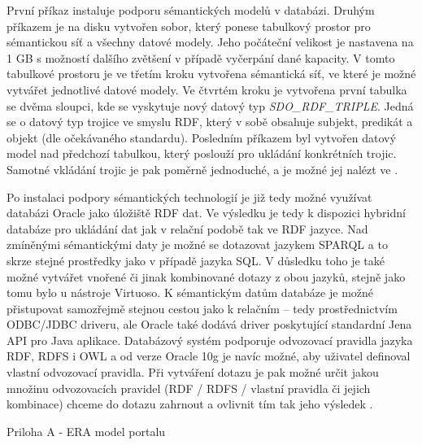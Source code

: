 \documentclass{projekt}
\begin{document}
První příkaz instaluje podporu sémantických modelů v databázi. Druhým příkazem je na disku vytvořen sobor, který ponese tabulkový prostor pro sémantickou síť a všechny datové modely. Jeho počáteční velikost je nastavena na 1 GB s možností dalšího zvětšení v případě vyčerpání dané kapacity. V tomto tabulkové prostoru je ve třetím kroku vytvořena sémantická síť, ve které je možné vytvářet jednotlivé datové modely. Ve čtvrtém kroku je vytvořena první tabulka se dvěma sloupci, kde se vyskytuje nový datový typ {\it SDO\_RDF\_TRIPLE}. Jedná se o datový typ trojice ve smyslu RDF, který v sobě obsahuje subjekt, predikát a objekt (dle očekávaného standardu). Posledním příkazem byl vytvořen datový model nad předchozí tabulkou, který poslouží pro ukládání konkrétních trojic. Samotné vkládání trojic je pak poměrně jednoduché, a je možné jej nalézt ve \cite{_26}.

Po instalaci podpory sémantických technologií je již tedy možné využívat databázi Oracle jako úložiště RDF dat. Ve výsledku je tedy k dispozici hybridní databáze pro ukládání dat jak v relační podobě tak ve RDF jazyce. Nad zmíněnými sémantickými daty je možné se dotazovat jazykem SPARQL a to skrze stejné prostředky jako v případě jazyka SQL. V důsledku toho je také možné vytvářet vnořené či jinak kombinované dotazy z obou jazyků, stejně jako tomu bylo u nástroje Virtuoso. K sémantickým datům databáze je možné přistupovat samozřejmě stejnou cestou jako k relačním – tedy prostřednictvím ODBC/JDBC driveru, ale Oracle také dodává driver poskytující standardní Jena API pro Java aplikace. 
Databázový systém podporuje odvozovací pravidla jazyka RDF, RDFS i OWL a od verze Oracle 10g je navíc možné, aby uživatel definoval vlastní odvozovací pravidla. Při vytváření dotazu je pak možné určit jakou množinu odvozovacích pravidel (RDF / RDFS / vlastní pravidla či jejich kombinace) chceme do dotazu zahrnout a ovlivnit tím tak jeho výsledek \cite{_26}.





Priloha A - ERA model portalu
\end{document}
